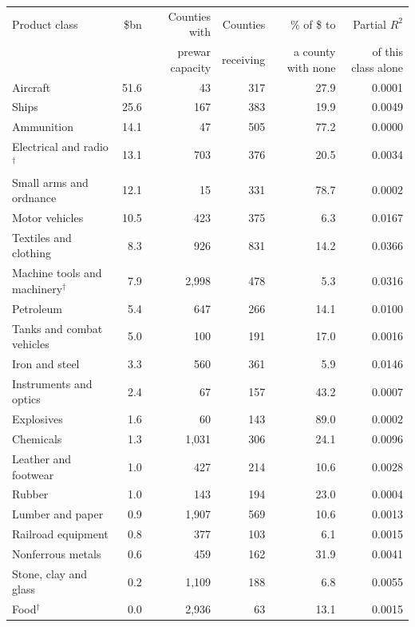 \begin{tabular}{lrrrrr}
\toprule
Product class & \$bn & Counties with & Counties & \% of \$ to & Partial $R^2$ \\
 & & prewar capacity & receiving & a county with none & of this class alone \\
\midrule
Aircraft & 51.6 & 43 & 317 & 27.9 & 0.0001 \\
Ships & 25.6 & 167 & 383 & 19.9 & 0.0049 \\
Ammunition & 14.1 & 47 & 505 & 77.2 & 0.0000 \\
Electrical and radio$^{\dagger}$ & 13.1 & 703 & 376 & 20.5 & 0.0034 \\
Small arms and ordnance & 12.1 & 15 & 331 & 78.7 & 0.0002 \\
Motor vehicles & 10.5 & 423 & 375 & 6.3 & 0.0167 \\
Textiles and clothing & 8.3 & 926 & 831 & 14.2 & 0.0366 \\
Machine tools and machinery$^{\dagger}$ & 7.9 & 2,998 & 478 & 5.3 & 0.0316 \\
Petroleum & 5.4 & 647 & 266 & 14.1 & 0.0100 \\
Tanks and combat vehicles & 5.0 & 100 & 191 & 17.0 & 0.0016 \\
Iron and steel & 3.3 & 560 & 361 & 5.9 & 0.0146 \\
Instruments and optics & 2.4 & 67 & 157 & 43.2 & 0.0007 \\
Explosives & 1.6 & 60 & 143 & 89.0 & 0.0002 \\
Chemicals & 1.3 & 1,031 & 306 & 24.1 & 0.0096 \\
Leather and footwear & 1.0 & 427 & 214 & 10.6 & 0.0028 \\
Rubber & 1.0 & 143 & 194 & 23.0 & 0.0004 \\
Lumber and paper & 0.9 & 1,907 & 569 & 10.6 & 0.0013 \\
Railroad equipment & 0.8 & 377 & 103 & 6.1 & 0.0015 \\
Nonferrous metals & 0.6 & 459 & 162 & 31.9 & 0.0041 \\
Stone, clay and glass & 0.2 & 1,109 & 188 & 6.8 & 0.0055 \\
Food$^{\dagger}$ & 0.0 & 2,936 & 63 & 13.1 & 0.0015 \\
\bottomrule
\end{tabular}